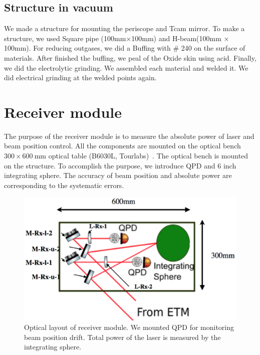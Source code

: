 \subsection{Structure in vacuum}
We made a structure for mounting the periscope and Tcam mirror. To make a structure, we used Square pipe (100mm$\times$100mm) and H-beam(100mm $\times$ 100mm). For reducing outgases, we did a Buffing with \# 240 on the surface of materials.
After finished the buffing, we peal  of the Oxide skin using acid. Finally, we did the electrolytic grinding. We assembled each material and welded it. We did electrical grinding  at the welded points again.

\section{Receiver module}
The purpose of the receiver module is to measure the absolute power of laser and beam position control.
All the components are mounted on the optical bench $300 \times 600~\mathrm{mm}$ optical table (B6030L, Tourlabs)~\cite{Thorlabs}. 
The optical bench is mounted on the structure.
To accomplish the purpose, we introduce QPD and  6 inch integrating sphere.
The accuracy of beam position and absolute power are corresponding to the systematic errors. 
\begin{figure}
\begin{center}
\includegraphics[width=14cm]{Figures/Rx_module_layout.eps}
\caption{Optical layout of receiver module. We mounted QPD for monitoring beam position drift. Total power of the laser is measured by the integrating sphere.} 
\label{fig:Rx_module_layout} 
\end{center}
\end{figure}

